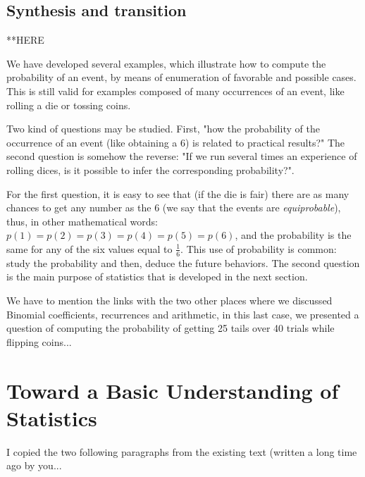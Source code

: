 
\subsection{Synthesis and transition}

**HERE

We have developed several examples, which illustrate how to compute the probability of an event,
by means of enumeration of favorable and possible cases. 
This is still valid for examples composed of many occurrences of an event,
like rolling a die or tossing coins. 

Two kind of questions may be studied.
First, "how the probability of the occurrence of an event (like obtaining a $6$) is related to practical results?"
The second question is somehow the reverse: "If we run several times an experience of rolling dices, is it possible 
to infer the corresponding probability?".

For the first question, it is easy to see that (if the die is fair) there are as many chances to get any number as the $6$
(we say that the events are \textit{equiprobable}),
thus, in other mathematical words: $p(1)=p(2)=p(3)=p(4)=p(5)=p(6)$,
and the probability is the same for any of the six values equal to $\frac{1}{6}$.
This use of probability is common: study the probability and then, deduce the future behaviors.
The second question is the main purpose of statistics that is developed in the next section.


{\Denis We have to mention the links with the two other places where we discussed Binomial coefficients, recurrences and arithmetic, in this last case, we presented a question of computing the probability of getting 25 tails over 40 trials while flipping coins...}



\section{Toward a Basic Understanding of Statistics}
\label{sec:statistics}

{\Denis I copied the two following paragraphs from the existing text (written a long time ago by you...}

